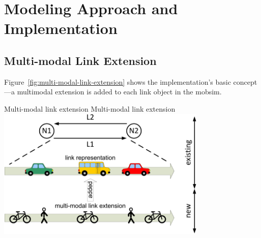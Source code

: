 %
%

\section{Modeling Approach and Implementation}
\subsection{Multi-modal Link Extension} 
\label{sec:Multi-modalSimulation}
Figure~\ref{fig:multi-modal-link-extension} shows the implementation's basic concept---a \gls{multimodal} extension is added to each link object in the \gls{mobsim}. 

\createfigure%
{Multi-modal link extension}%
{Multi-modal link extension}%
{\label{fig:multi-modal-link-extension}}%
{\includegraphics[width=0.75\textwidth, angle=0]{extending/figures/MultiModalSimulation/multi-modal-link-extension}}%
{}

